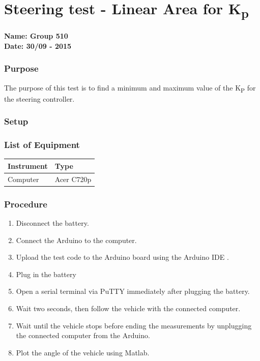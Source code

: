 \pagebreak
\section{Steering test - Linear Area for \si{K_p}} \label{app:LinearAreaKp}
\textbf{Name: Group 510}\\
\textbf{Date: 30/09 - 2015}

\subsubsection{Purpose}
The purpose of this test is to find a minimum and maximum value of the \si{K_P} for the steering controller.

\subsubsection{Setup}


\subsubsection{List of Equipment}

\begin{table}[H]
\begin{tabular}{|p{10cm}|p{4cm}|}
\hline%
  \textbf{Instrument}                     &  \textbf{Type}       \\
\hline%
  Computer                                &  Acer C720p    \\
\hline %
\end{tabular}
\end{table}

\subsubsection{Procedure}

\begin{enumerate}
  \item Disconnect the battery.
  \item Connect the Arduino to the computer.
  \item Upload the test code to the Arduino board using the Arduino IDE  \cite{ArduinoIDE}.
  \item Plug in the battery
  \item Open a serial terminal via PuTTY \cite{PuTTY} immediately after plugging the battery.
  \item Wait two seconds, then follow the vehicle with the connected computer.
  \item Wait until the vehicle stops before ending the measurements by unplugging the connected computer from the Arduino.
  \item Plot the angle of the vehicle using Matlab.
\end{enumerate}

